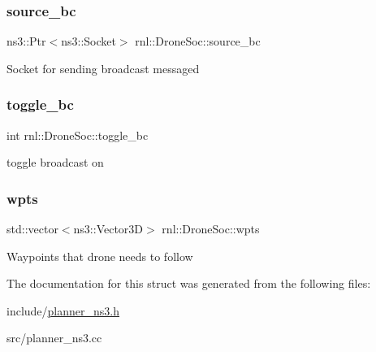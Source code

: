 \subsubsection{\texorpdfstring{source\+\_\+bc}{source\_bc}}
{\footnotesize\ttfamily ns3\+::\+Ptr$<$ns3\+::\+Socket$>$ rnl\+::\+Drone\+Soc\+::source\+\_\+bc}

Socket for sending broadcast messaged \mbox{\label{structrnl_1_1DroneSoc_a0551bc4498f75645a7a0fed0c3d2fb00}} 
\subsubsection{\texorpdfstring{toggle\+\_\+bc}{toggle\_bc}}
{\footnotesize\ttfamily int rnl\+::\+Drone\+Soc\+::toggle\+\_\+bc}

toggle broadcast on \mbox{\label{structrnl_1_1DroneSoc_af6f5003ab01dd213cfed46f595e68694}} 
\subsubsection{\texorpdfstring{wpts}{wpts}}
{\footnotesize\ttfamily std\+::vector$<$ns3\+::\+Vector3D$>$ rnl\+::\+Drone\+Soc\+::wpts}

Waypoints that drone needs to follow 

The documentation for this struct was generated from the following files\+:\begin{DoxyCompactItemize}
\item 
include/\hyperlink{planner__ns3_8h}{planner\+\_\+ns3.\+h}\item 
src/planner\+\_\+ns3.\+cc\end{DoxyCompactItemize}
